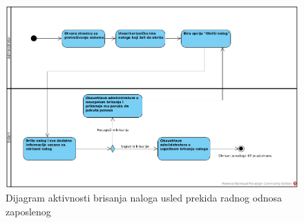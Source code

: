 \begin{figure}[H]
\begin{center}
\includegraphics[width=\textwidth]{Pictures/activity_employee_delete.png}
\end{center}
    \caption{Dijagram aktivnosti brisanja naloga usled  prekida radnog odnosa zaposlenog}
\label{fig:ActivityDeleteEmployeeAccount}
\end{figure}
